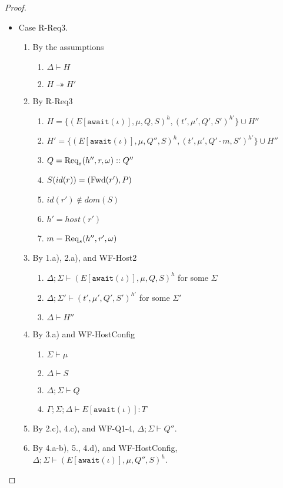 \begin{proof}
\begin{itemize}
\item Case R-Req3.
\begin{enumerate}
\item By the assumptions
  \begin{enumerate}[label=(\alph*)]
  \item $\Delta \vdash H$
  \item $H \twoheadrightarrow H'$
  \end{enumerate}
\item By R-Req3
  \begin{enumerate}[label=(\alph*)]
  \item $H = \{ (E[\texttt{await}(\iota)], \mu, Q, S)^h, (t', \mu', Q', S')^{h'} \} \cup H''$
  \item $H' = \{ (E[\texttt{await}(\iota)], \mu, Q'', S)^h, (t', \mu', Q' \cdot m, S')^{h'} \} \cup H''$
  \item $Q         = {\textrm{Req}_s(h'', r, \omega)} :: Q''$
  \item $S(id(r))  = (\textrm{Fwd}(r'), P)$
  \item $id(r') \notin dom(S)$
  \item $h'        = host(r')$
  \item $m         = {\textrm{Req}_s(h'', r', \omega)}$
  \end{enumerate}
\item By 1.a), 2.a), and WF-Host2
  \begin{enumerate}[label=(\alph*)]
  \item $\Delta ; \Sigma \vdash (E[\texttt{await}(\iota)], \mu, Q, S)^h$ for some $\Sigma$
  \item $\Delta ; \Sigma' \vdash (t', \mu', Q', S')^{h'}$ for some $\Sigma'$
  \item $\Delta \vdash H''$
  \end{enumerate}
\item By 3.a) and WF-HostConfig
  \begin{enumerate}[label=(\alph*)]
  \item $\Sigma \vdash \mu$
  \item $\Delta \vdash S$
  \item $\Delta ; \Sigma \vdash Q$
  \item $\Gamma ; \Sigma ; \Delta \vdash E[\texttt{await}(\iota)] : T$
  \end{enumerate}
\item By 2.c), 4.c), and WF-Q1-4, $\Delta ; \Sigma \vdash Q''$.
\item By 4.a-b), 5., 4.d), and WF-HostConfig, $\Delta ; \Sigma \vdash (E[\texttt{await}(\iota)], \mu, Q'', S)^h$.

\end{enumerate}
\end{itemize}
\end{proof}
